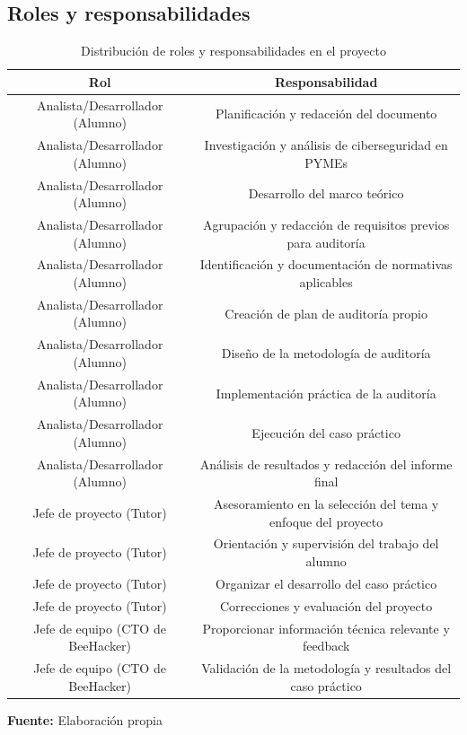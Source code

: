\documentclass[a4paper, 11pt]{article}
\begin{document}
\subsection{Roles y responsabilidades}

\begin{table}[H]
    \centering
    \caption{Distribución de roles y responsabilidades en el proyecto}
    \begin{tabular}{|c|c|}

        \hline
        \textbf{Rol} & \textbf{Responsabilidad} \\
        \hline
        Analista/Desarrollador (Alumno) & Planificación y redacción del documento \\
        \hline
        Analista/Desarrollador (Alumno) & Investigación y análisis de ciberseguridad en PYMEs \\
        \hline
        Analista/Desarrollador (Alumno) & Desarrollo del marco teórico \\
        \hline
        Analista/Desarrollador (Alumno) & Agrupación y redacción de requisitos previos para auditoría \\
        \hline
        Analista/Desarrollador (Alumno) & Identificación y documentación de normativas aplicables \\
        \hline
        Analista/Desarrollador (Alumno) & Creación de plan de auditoría propio \\
        \hline
        Analista/Desarrollador (Alumno) & Diseño de la metodología de auditoría \\
        \hline
        Analista/Desarrollador (Alumno) & Implementación práctica de la auditoría \\
        \hline
        Analista/Desarrollador (Alumno) & Ejecución del caso práctico \\
        \hline
        Analista/Desarrollador (Alumno) & Análisis de resultados y redacción del informe final \\
        \hline
        Jefe de proyecto (Tutor) & Asesoramiento en la selección del tema y enfoque del proyecto \\
        \hline
        Jefe de proyecto (Tutor) & Orientación y supervisión del trabajo del alumno \\
        \hline
        Jefe de proyecto (Tutor) & Organizar el desarrollo del caso práctico \\
        \hline
        Jefe de proyecto (Tutor) & Correcciones y evaluación del proyecto \\
        \hline
        Jefe de equipo (CTO de BeeHacker) & Proporcionar información técnica relevante y feedback \\
        \hline
        Jefe de equipo (CTO de BeeHacker) & Validación de la metodología y resultados del caso práctico \\
        \hline

    \end{tabular}
    \begin{flushleft}\centering
        \footnotesize \textbf{Fuente:} Elaboración propia
    \end{flushleft}    
    \label{tab:distribucion_roles}
\end{table}
\end{document}
